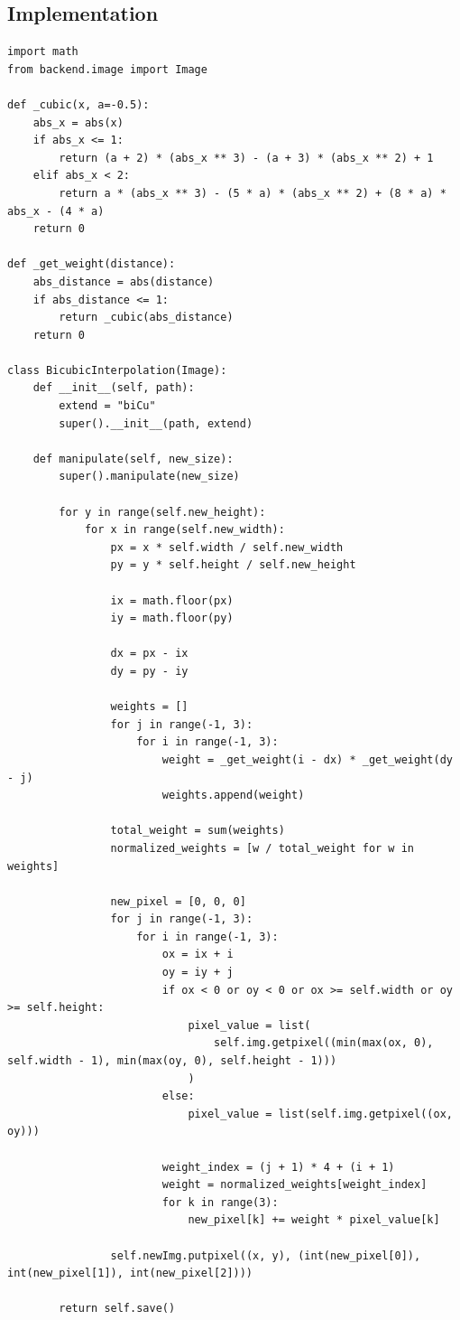     \subsection{Implementation}
    \begin{lstlisting}
import math
from backend.image import Image

def _cubic(x, a=-0.5):
    abs_x = abs(x)
    if abs_x <= 1:
        return (a + 2) * (abs_x ** 3) - (a + 3) * (abs_x ** 2) + 1
    elif abs_x < 2:
        return a * (abs_x ** 3) - (5 * a) * (abs_x ** 2) + (8 * a) * abs_x - (4 * a)
    return 0

def _get_weight(distance):
    abs_distance = abs(distance)
    if abs_distance <= 1:
        return _cubic(abs_distance)
    return 0

class BicubicInterpolation(Image):
    def __init__(self, path):
        extend = "biCu"
        super().__init__(path, extend)

    def manipulate(self, new_size):
        super().manipulate(new_size)

        for y in range(self.new_height):
            for x in range(self.new_width):
                px = x * self.width / self.new_width
                py = y * self.height / self.new_height

                ix = math.floor(px)
                iy = math.floor(py)

                dx = px - ix
                dy = py - iy

                weights = []
                for j in range(-1, 3):
                    for i in range(-1, 3):
                        weight = _get_weight(i - dx) * _get_weight(dy - j)
                        weights.append(weight)

                total_weight = sum(weights)
                normalized_weights = [w / total_weight for w in weights]

                new_pixel = [0, 0, 0]
                for j in range(-1, 3):
                    for i in range(-1, 3):
                        ox = ix + i
                        oy = iy + j
                        if ox < 0 or oy < 0 or ox >= self.width or oy >= self.height:
                            pixel_value = list(
                                self.img.getpixel((min(max(ox, 0), self.width - 1), min(max(oy, 0), self.height - 1)))
                            )
                        else:
                            pixel_value = list(self.img.getpixel((ox, oy)))

                        weight_index = (j + 1) * 4 + (i + 1)
                        weight = normalized_weights[weight_index]
                        for k in range(3):
                            new_pixel[k] += weight * pixel_value[k]

                self.newImg.putpixel((x, y), (int(new_pixel[0]), int(new_pixel[1]), int(new_pixel[2])))

        return self.save()
    \end{lstlisting}


